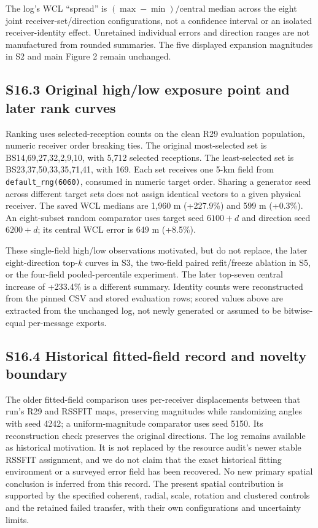 \documentclass[journal,onecolumn,10pt]{IEEEtran}
\begin{document}
The log's WCL ``spread'' is $(\max-\min)/\text{central median}$ across the eight joint receiver-set/direction configurations, not a confidence interval or an isolated receiver-identity effect. Unretained individual errors and direction ranges are not manufactured from rounded summaries. The five displayed expansion magnitudes in S2 and main Figure 2 remain unchanged.

\subsection*{S16.3 Original high/low exposure point and later rank curves}
Ranking uses selected-reception counts on the clean R29 evaluation population, numeric receiver order breaking ties. The original most-selected set is BS14,69,27,32,2,9,10, with 5,712 selected receptions. The least-selected set is BS23,37,50,33,35,71,41, with 169. Each set receives one 5-km field from \texttt{default\_rng(6060)}, consumed in numeric target order. Sharing a generator seed across different target sets does not assign identical vectors to a given physical receiver. The saved WCL medians are 1,960 m (+227.9\%) and 599 m (+0.3\%). An eight-subset random comparator uses target seed $6100+d$ and direction seed $6200+d$; its central WCL error is 649 m (+8.5\%).

These single-field high/low observations motivated, but do not replace, the later eight-direction top-$k$ curves in S3, the two-field paired refit/freeze ablation in S5, or the four-field pooled-percentile experiment. The later top-seven central increase of +233.4\% is a different summary. Identity counts were reconstructed from the pinned CSV and stored evaluation rows; scored values above are extracted from the unchanged log, not newly generated or assumed to be bitwise-equal per-message exports.

\subsection*{S16.4 Historical fitted-field record and novelty boundary}
The older fitted-field comparison uses per-receiver displacements between that run's R29 and RSSFIT maps, preserving magnitudes while randomizing angles with seed 4242; a uniform-magnitude comparator uses seed 5150. Its reconstruction check preserves the original directions. The log remains available as historical motivation. It is not replaced by the resource audit's newer stable RSSFIT assignment, and we do not claim that the exact historical fitting environment or a surveyed error field has been recovered. No new primary spatial conclusion is inferred from this record. The present spatial contribution is supported by the specified coherent, radial, scale, rotation and clustered controls and the retained failed transfer, with their own configurations and uncertainty limits.
\end{document}
